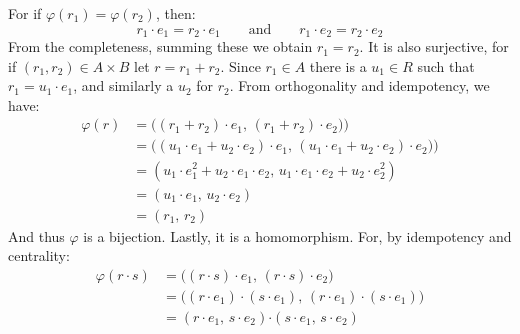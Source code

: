 \documentclass[crop=false,class=article]{standalone}                           %
\begin{document}
\begin{solution}
            For if $\varphi(r_{1})=\varphi(r_{2})$, then:
            \begin{equation}
                r_{1}\cdot{e}_{1}=r_{2}\cdot{e}_{1}
                \quad\quad
                \textrm{and}
                \quad\quad
                r_{1}\cdot{e}_{2}=r_{2}\cdot{e_{2}}
            \end{equation}
            From the completeness, summing these we obtain $r_{1}=r_{2}$.
            It is also surjective, for if $(r_{1},r_{2})\in{A}\times{B}$
            let $r=r_{1}+r_{2}$. Since $r_{1}\in{A}$ there is a
            $u_{1}\in{R}$ such that $r_{1}=u_{1}\cdot{e}_{1}$, and similarly
            a $u_{2}$ for $r_{2}$. From orthogonality and idempotency,
            we have:
            \begin{subequations}
                \begin{align}
                    \varphi(r)
                    &=\big((r_{1}+r_{2})\cdot{e}_{1},\,
                           (r_{1}+r_{2})\cdot{e}_{2})\big)\\
                    &=\big(
                        (u_{1}\cdot{e}_{1}+u_{2}\cdot{e}_{2})\cdot{e}_{1},\,
                        (u_{1}\cdot{e}_{1}+u_{2}\cdot{e}_{2})\cdot{e}_{2})
                    \big)\\
                    &=(u_{1}\cdot{e}_{1}^{2}+
                       u_{2}\cdot{e}_{1}\cdot{e}_{2},\,
                       u_{1}\cdot{e}_{1}\cdot{e}_{2}+
                       u_{2}\cdot{e}_{2}^{2})\\
                     &=(u_{1}\cdot{e}_{1},\,u_{2}\cdot{e}_{2})\\
                     &=(r_{1},\,r_{2})
                \end{align}
            \end{subequations}
            And thus $\varphi$ is a bijection. Lastly, it is a homomorphism.
            For, by idempotency and centrality:
            \begin{subequations}
                \begin{align}
                    \varphi(r\cdot{s})
                    &=\big((r\cdot{s})\cdot{e}_{1},\,
                           (r\cdot{s})\cdot{e}_{2}\big)\\
                    &=\big((r\cdot{e}_{1})\cdot(s\cdot{e}_{1}),\,
                           (r\cdot{e}_{1})\cdot(s\cdot{e}_{1})\big)\\
                    &=(r\cdot{e}_{1},\,s\cdot{e}_{2})\boldsymbol{\cdot}
                      (s\cdot{e}_{1},\,s\cdot{e}_{2})\\

\end{align}
\end{subequations}
\end{solution}
\end{document}

